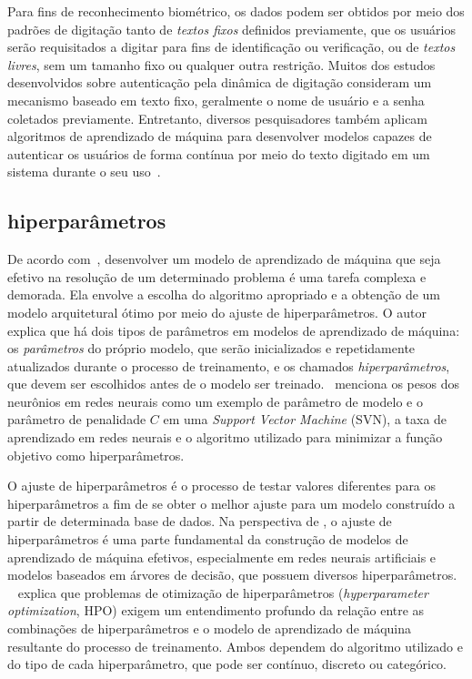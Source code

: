 Para fins de reconhecimento biométrico, os dados podem ser obtidos por meio dos padrões de digitação tanto de \textit{textos fixos} definidos previamente, que os usuários serão requisitados a digitar para fins de identificação ou verificação, ou de \textit{textos livres}, sem um tamanho fixo ou qualquer outra restrição. Muitos dos estudos desenvolvidos sobre autenticação pela dinâmica de digitação consideram um mecanismo baseado em texto fixo, geralmente o nome de usuário e a senha coletados previamente. Entretanto, diversos pesquisadores também aplicam algoritmos de aprendizado de máquina para desenvolver modelos capazes de autenticar os usuários de forma contínua por meio do texto digitado em um sistema durante o seu uso~\cite{continuous_auth_by_free_text_keystroke_based_on_cnn_and_rnn}.


\subsection{hiperparâmetros}\label{subsec:ajuste_de_hiperparametros}

De acordo com~, desenvolver um modelo de aprendizado de máquina que seja efetivo na resolução de um determinado problema é uma tarefa complexa e demorada. Ela envolve a escolha do algoritmo apropriado e a obtenção de um modelo arquitetural ótimo por meio do ajuste de hiperparâmetros. O autor explica que há dois tipos de parâmetros em modelos de aprendizado de máquina: os \textit{parâmetros} do próprio modelo, que serão inicializados e repetidamente atualizados durante o processo de treinamento, e os chamados \textit{hiperparâmetros}, que devem ser escolhidos antes de o modelo ser treinado.~ menciona os pesos dos neurônios em redes neurais como um exemplo de parâmetro de modelo e o parâmetro de penalidade $C$ em uma \textit{Support Vector Machine} (SVN), a taxa de aprendizado em redes neurais e o algoritmo utilizado para minimizar a função objetivo como hiperparâmetros.

O ajuste de hiperparâmetros é o processo de testar valores diferentes para os hiperparâmetros a fim de se obter o melhor ajuste para um modelo construído a partir de determinada base de dados. Na perspectiva de , o ajuste de hiperparâmetros é uma parte fundamental da construção de modelos de aprendizado de máquina efetivos, especialmente em redes neurais artificiais e modelos baseados em árvores de decisão, que possuem diversos hiperparâmetros.
~ explica que problemas de otimização de hiperparâmetros (\textit{hyperparameter optimization}, HPO) exigem um entendimento profundo da relação entre as combinações de hiperparâmetros e o modelo de aprendizado de máquina resultante do processo de treinamento. Ambos dependem do algoritmo utilizado e do tipo de cada hiperparâmetro, que pode ser contínuo, discreto ou categórico.

